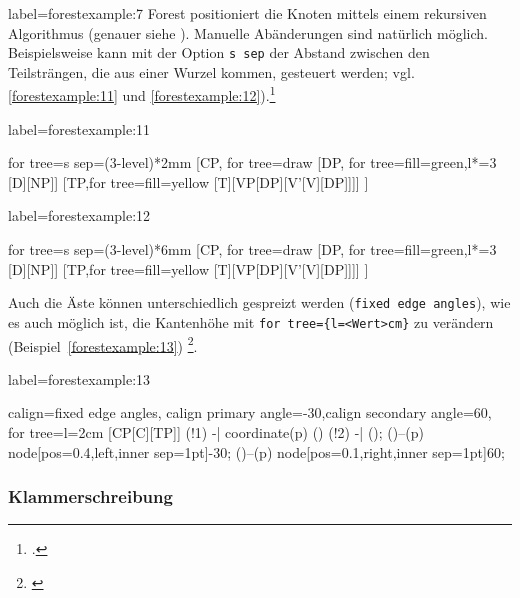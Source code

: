 \begin{lfgwcode}{label={forestexample:7}}
Forest positioniert die Knoten mittels einem rekursiven Algorithmus (genauer siehe 
\cite[Kap.\,2.4]{zivanovic:forest}). Manuelle Abänderungen sind natürlich möglich. Beispielsweise
kann mit der Option 
\texttt{s sep} der Abstand zwischen den Teilsträngen, die aus einer Wurzel kommen, 
gesteuert werden; vgl. \ref{forestexample:11} und
\ref{forestexample:12}).\footnote{\cite[Beispiel\,27]{zivanovic:forest}.}


\begin{lfgwexample}{label={forestexample:11}}
\begin{forest}
for tree={s sep=(3-level)*2mm}
[CP, for tree=draw
[DP, for tree={fill=green},l*=3
[D][NP]]
[TP,for tree={fill=yellow}
[T][VP[DP][V’[V][DP]]]]
]
\end{forest}
\end{lfgwexample}

\begin{lfgwexample}{label={forestexample:12}}
\begin{forest}
for tree={s sep=(3-level)*6mm}
[CP, for tree=draw
[DP, for tree={fill=green},l*=3
[D][NP]]
[TP,for tree={fill=yellow}
[T][VP[DP][V’[V][DP]]]]
]
\end{forest}
\end{lfgwexample}

Auch die Äste können unterschiedlich gespreizt werden (\texttt{fixed edge angles}),
wie es auch möglich ist, die Kantenhöhe mit \lstinline|for tree={l=<Wert>cm}| zu verändern 
(Beispiel~\ref{forestexample:13})
\footnote{\cite[Beispiel~59]{zivanovic:forest}}.

\begin{lfgwexample}{label={forestexample:13}}
\begin{forest}
calign=fixed edge angles,
calign primary angle=-30,calign secondary angle=60,
for tree={l=2cm}
[CP[C][TP]]
\draw[dotted] (!1) -| coordinate(p) () (!2) -| ();
\path ()--(p) node[pos=0.4,left,inner sep=1pt]{-30};
\path ()--(p) node[pos=0.1,right,inner sep=1pt]{60};
\end{forest}
\end{lfgwexample}

\subsubsection{Klammerschreibung}


\end{lfgwcode}
